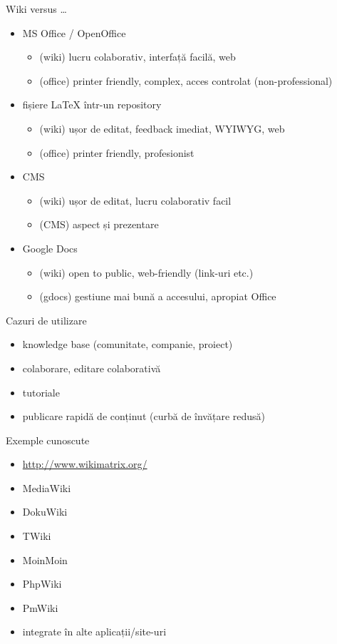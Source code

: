 \documentclass{beamer}
\begin{document}
\begin{frame}{Wiki versus \ldots}
  \begin{itemize}
    \item MS Office / OpenOffice
      \begin{itemize}
        \item (wiki) lucru colaborativ, interfață facilă, web
        \item (office) printer friendly, complex, acces controlat
    (non-professional)
      \end{itemize}
    \item fișiere LaTeX într-un repository
      \begin{itemize}
        \item (wiki) ușor de editat, feedback imediat, WYIWYG, web
        \item (office) printer friendly, profesionist
      \end{itemize}
    \item CMS
      \begin{itemize}
        \item (wiki) ușor de editat, lucru colaborativ facil
        \item (CMS) aspect și prezentare
      \end{itemize}
    \item Google Docs
      \begin{itemize}
        \item (wiki) open to public, web-friendly (link-uri etc.)
        \item (gdocs) gestiune mai bună a accesului, apropiat Office
      \end{itemize}
  \end{itemize}
\end{frame}

\begin{frame}{Cazuri de utilizare}
  \begin{itemize}
    \item knowledge base (comunitate, companie, proiect)
    \item colaborare, editare colaborativă
    \item tutoriale
    \item publicare rapidă de conținut (curbă de învățare redusă)
  \end{itemize}
\end{frame}

\begin{frame}{Exemple cunoscute}
  \begin{itemize}
    \item \url{http://www.wikimatrix.org/}
    \item MediaWiki
    \item DokuWiki
    \item TWiki
    \item MoinMoin
    \item PhpWiki
    \item PmWiki
    \item integrate în alte aplicații/site-uri
  \end{itemize}
\end{frame}
\end{document}
